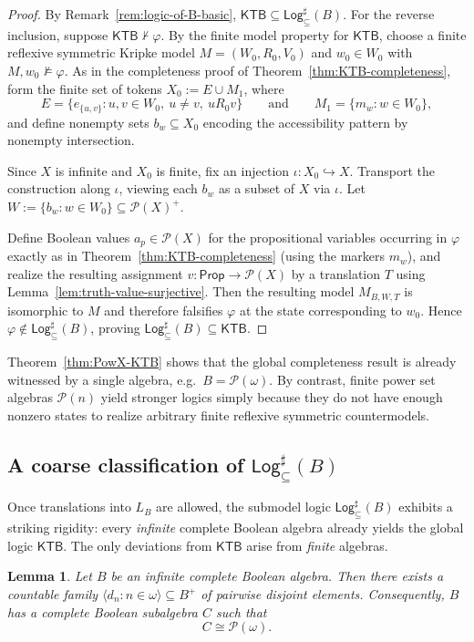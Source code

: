 \documentclass[11pt]{amsart}
\theoremstyle{definition}
\theoremstyle{plain}
\newtheorem{lemma}[definition]{Lemma}
\newcommand{\Pow}{\mathcal P}
\newcommand{\Prop}{\mathsf{Prop}}
\newcommand{\LB}{L_B}     %
\newcommand{\KTB}{\mathsf{KTB}}
\newcommand{\Logsub}{\mathsf{Log}_{\subseteq}^{\sharp}}
\begin{document}
\begin{proof}
By Remark~\ref{rem:logic-of-B-basic}, $\KTB\subseteq \Logsub(B)$.
For the reverse inclusion, suppose $\KTB\nvdash \varphi$.
By the finite model property for $\KTB$, choose a finite reflexive symmetric Kripke model $M=(W_0,R_0,V_0)$ and
$w_0\in W_0$ with $M,w_0\not\models \varphi$.
As in the completeness proof of Theorem~\ref{thm:KTB-completeness}, form the finite set of tokens
$X_0:=E\cup M_1$, where
\[
E=\{e_{\{u,v\}}:u,v\in W_0,\ u\neq v,\ uR_0v\}
\qquad\text{and}\qquad
M_1=\{m_w:w\in W_0\},
\]
and define nonempty sets $b_w\subseteq X_0$ encoding the accessibility pattern by nonempty intersection.

Since $X$ is infinite and $X_0$ is finite, fix an injection $\iota:X_0\hookrightarrow X$.
Transport the construction along $\iota$, viewing each $b_w$ as a subset of $X$ via $\iota$.
Let $W:=\{b_w:w\in W_0\}\subseteq \Pow(X)^+$.

Define Boolean values $a_p\in \Pow(X)$ for the propositional variables occurring in $\varphi$ exactly as in
Theorem~\ref{thm:KTB-completeness} (using the markers $m_w$), and realize the resulting assignment
$v:\Prop\to \Pow(X)$ by a translation $T$ using Lemma~\ref{lem:truth-value-surjective}.
Then the resulting model $M_{B,W,T}$ is isomorphic to $M$ and therefore
falsifies $\varphi$ at the state corresponding to $w_0$.
Hence $\varphi\notin \Logsub(B)$, proving $\Logsub(B)\subseteq \KTB$.
\end{proof}

Theorem~\ref{thm:PowX-KTB} shows that the global completeness result is already witnessed by a single algebra,
e.g.\ $B=\Pow(\omega)$. By contrast, finite power set algebras $\Pow(n)$ yield stronger logics simply because
they do not have enough nonzero states to realize arbitrary finite reflexive symmetric countermodels.

\subsection{A coarse classification of \texorpdfstring{$\Logsub(B)$}{Log(B)}}\label{subsec:classification}

Once translations into $\LB$ are allowed, the submodel logic $\Logsub(B)$
exhibits a striking rigidity: every \emph{infinite} complete Boolean algebra already yields the global logic $\KTB$.
The only deviations from $\KTB$ arise from \emph{finite} algebras.


\begin{lemma}\label{lem:contains-Pow-omega}
Let $B$ be an infinite complete Boolean algebra. Then there exists a countable family
$\langle d_n:n\in\omega\rangle\subseteq B^+$ of pairwise disjoint elements.
Consequently, $B$ has a complete Boolean subalgebra $C$ such that
\[
C\cong \Pow(\omega).
\]
\end{lemma}
\end{document}
